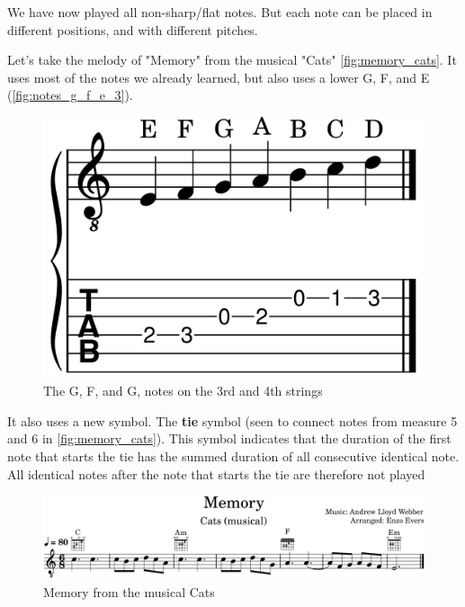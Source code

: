 
\newpage

We have now played all non-sharp/flat notes. But each note can be placed in different positions, and with different pitches.

Let's take the melody of "Memory" from the musical "Cats" \autoref{fig:memory_cats}. It uses most of the notes we already learned, but also uses a lower G, F, and E (\autoref{fig:notes_g_f_e_3}).


\begin{figure}[h]
	\centering
	\includegraphics[height=0.12\textheight]{../../MuseScore/Guitar/NotesUsedInMemoryCats.png}
	\caption{The G, F, and G, notes on the 3rd and 4th strings}
	\label{fig:notes_g_f_e_3}
\end{figure}

It also uses a new symbol. The \textbf{tie} symbol (seen to connect notes from measure 5 and 6 in \autoref{fig:memory_cats}). This symbol indicates that the duration of the first note that starts the tie has the summed duration of all consecutive identical note. All identical notes after the note that starts the tie are therefore not played

\begin{figure}[h]
	\centering
	\includegraphics[width=\textwidth]{../../MuseScore/Guitar/GuitarMemoryCats.png}
	\caption{Memory from the musical Cats}
	\label{fig:memory_cats}
\end{figure}

